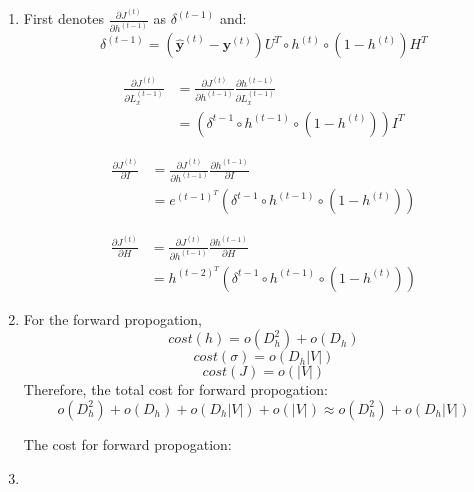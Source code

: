 \documentclass[10pt]{article}
\begin{document}
\begin{enumerate}[label=(\alph*)]
\item
First denotes $\frac{\partial J^{(t)}}{\partial h^{(t-1)}}$ as $\delta^{(t-1)}$ and:
\begin{equation*}
	\delta^{(t-1)} =(\hat{\mathbf{y}}^{(t)} - \mathbf{y}^{(t)})U^{T}\circ h^{(t)}\circ(1-h^{(t)})H^{T}
\end{equation*}

\begin{equation}
\begin{aligned}
	\frac{\partial J^{(t)}}{\partial L_x^{(t-1)}} & = \frac{\partial J^{(t)}}{\partial h^{(t-1)}}
	\frac{\partial h^{(t-1)}}{\partial L_x^{(t-1)}}\\
	& = (\delta^{t-1}\circ h^{(t-1)}\circ(1-h^{(t)}))I^{T}
\end{aligned}
\end{equation}

\begin{equation}
\begin{aligned}
	\frac{\partial J^{(t)}}{\partial I} & = \frac{\partial J^{(t)}}{\partial h^{(t-1)}}
	\frac{\partial h^{(t-1)}}{\partial I}\\
	& = e^{(t-1)^T}(\delta^{t-1}\circ h^{(t-1)}\circ(1-h^{(t)}))
\end{aligned}
\end{equation}

\begin{equation}
\begin{aligned}
	\frac{\partial J^{(t)}}{\partial H} & = \frac{\partial J^{(t)}}{\partial h^{(t-1)}}
	\frac{\partial h^{(t-1)}}{\partial H}\\
	& = h^{(t-2)^T}(\delta^{t-1}\circ h^{(t-1)}\circ(1-h^{(t)}))
\end{aligned}
\end{equation}

\item
For the forward propogation,
\begin{equation*}
	cost(h) = o(D_h^2) + o(D_h)
\end{equation*}
\begin{equation*}
	cost(\sigma) = o(D_h|V|)
\end{equation*}
\begin{equation*}
	cost(J) = o(|V|)
\end{equation*}
Therefore, the total cost for forward propogation:
\begin{equation*}
	o(D_h^2) + o(D_h) + o(D_h|V|) + o(|V|) \approx o(D_h^2) + o(D_h|V|)
\end{equation*}

The cost for forward propogation:

\item

\end{enumerate}
\end{document}
